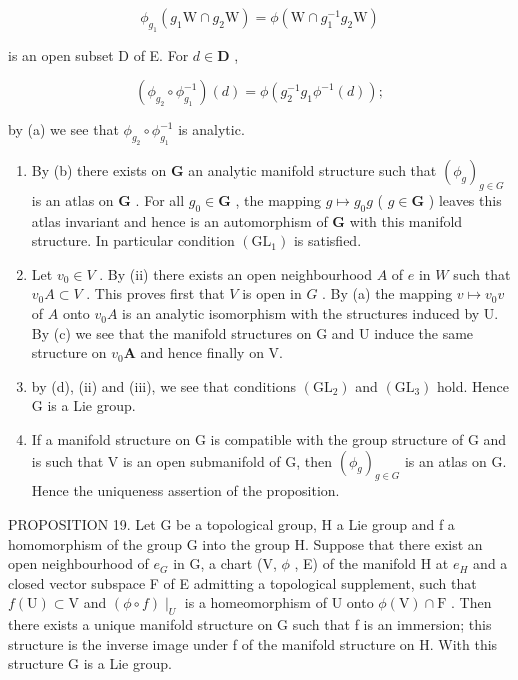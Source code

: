 \[
\phi_ {g _ {1}} (g _ {1} \mathrm{W} \cap g _ {2} \mathrm{W}) = \phi (\mathrm{W} \cap g _ {1} ^ {- 1} g _ {2} \mathrm{W})
\]

is an open subset D of E. For \(d \in \mathbf{D}\) ,

\[
\left(\phi_ {g _ {2}} \circ \phi_ {g _ {1}} ^ {- 1}\right) (d) = \phi \left(g _ {2} ^ {- 1} g _ {1} \phi^ {- 1} (d)\right);
\]

by (a) we see that \(\phi_{g_2} \circ \phi_{g_1}^{-1}\) is analytic.

\begin{enumerate}
\def\labelenumi{(\alph{enumi})}
\setcounter{enumi}{2}
\item
  By (b) there exists on \(\mathbf{G}\) an analytic manifold structure such that \((\phi_g)_{g\in G}\) is an atlas on \(\mathbf{G}\) . For all \(g_0\in \mathbf{G}\) , the mapping \(g\mapsto g_0g\) ( \(g\in \mathbf{G}\) ) leaves this atlas invariant and hence is an automorphism of \(\mathbf{G}\) with this manifold structure. In particular condition \((\mathrm{GL}_1)\) is satisfied.
\item
  Let \(v_{0} \in V\) . By (ii) there exists an open neighbourhood \(A\) of \(e\) in \(W\) such that \(v_{0}A \subset V\) . This proves first that \(V\) is open in \(G\) . By (a) the mapping \(v \mapsto v_{0}v\) of \(A\) onto \(v_{0}A\) is an analytic isomorphism with the structures induced by U. By (c) we see that the manifold structures on G and U induce the same structure on \(v_{0}\mathbf{A}\) and hence finally on V.
\item
  by (d), (ii) and (iii), we see that conditions \((\mathrm{GL}_2)\) and \((\mathrm{GL}_3)\) hold. Hence G is a Lie group.
\item
  If a manifold structure on G is compatible with the group structure of G and is such that V is an open submanifold of G, then \((\phi_{g})_{g\in G}\) is an atlas on G. Hence the uniqueness assertion of the proposition.
\end{enumerate}

PROPOSITION 19. Let G be a topological group, H a Lie group and f a homomorphism of the group G into the group H. Suppose that there exist an open neighbourhood of \(e_{G}\) in G, a chart (V, \(\phi\) , E) of the manifold H at \(e_{H}\) and a closed vector subspace F of E admitting a topological supplement, such that \(f(\mathrm{U}) \subset \mathrm{V}\) and \((\phi \circ f)\mid_U\) is a homeomorphism of U onto \(\phi(\mathrm{V}) \cap \mathrm{F}\) . Then there exists a unique manifold structure on G such that f is an immersion; this structure is the inverse image under f of the manifold structure on H. With this structure G is a Lie group.

